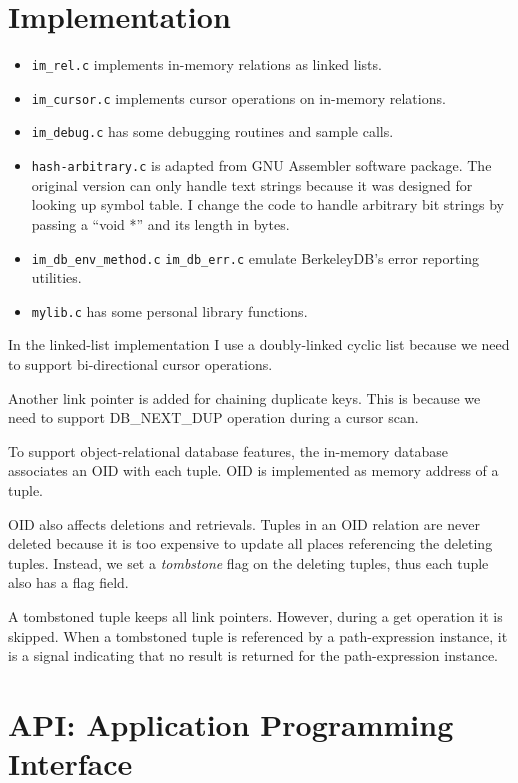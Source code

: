 \documentclass[11pt]{article}
\def\cdf{\sf }
\def\cdf{\sf }
\newcommand{\DBNEXTDUP}{{\small{\cdf DB\_NEXT\_DUP}}}
\begin{document}
\section{Implementation}
\begin{itemize}
\item {\tt im\_rel.c} implements in-memory relations as linked lists.
\item {\tt im\_cursor.c} implements cursor operations on in-memory
      relations.
\item {\tt im\_debug.c} has some debugging routines and sample calls.
\item {\tt hash-arbitrary.c} is adapted from GNU Assembler software
      package.  The original version can only handle text strings
      because it was designed for looking up symbol table.  I change
      the code to handle arbitrary bit strings by passing a ``void *''
      and its length in bytes.
\item {\tt im\_db\_env\_method.c} {\tt im\_db\_err.c} emulate BerkeleyDB's
      error reporting utilities.
\item {\tt mylib.c} has some personal library functions.
\end{itemize}

In the linked-list implementation I use a doubly-linked cyclic list
because we need to support bi-directional cursor operations.

Another link pointer is added for chaining duplicate keys.  This is
because we need to support {\DBNEXTDUP} operation during a cursor
scan.

To support object-relational database features, the in-memory database
associates an OID with each tuple.  OID is implemented as memory
address of a tuple.

OID also affects deletions and retrievals.  Tuples in an OID relation
are never deleted because it is too expensive to update all places
referencing the deleting tuples.  Instead, we set a {\em tombstone}
flag on the deleting tuples, thus each tuple also has a flag field.

A tombstoned tuple keeps all link pointers.  However, during a get
operation it is skipped.  When a tombstoned tuple is referenced by a
path-expression instance, it is a signal indicating that no result is
returned for the path-expression instance.
\newpage
\section{API: Application Programming Interface}
\end{document}

